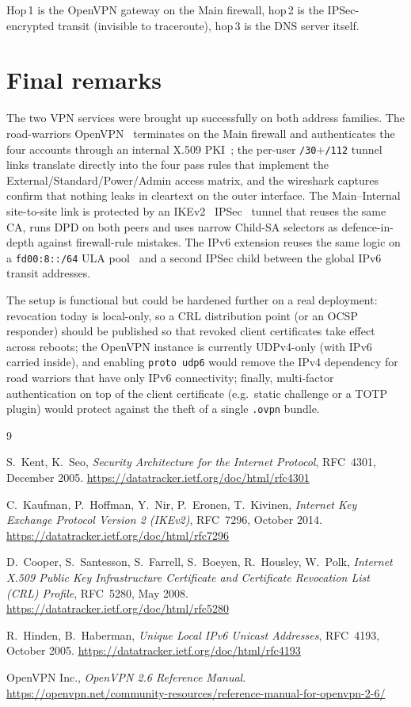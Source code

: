 \documentclass[twocolumn]{NobArticle}
\begin{document}
Hop\,1 is the OpenVPN gateway on the Main firewall, hop\,2 is the
IPSec-encrypted transit (invisible to traceroute), hop\,3 is the DNS
server itself.

\section{Final remarks}

The two VPN services were brought up successfully on both address
families. The road-warriors OpenVPN~\cite{openvpn} terminates on the
Main firewall and authenticates the four accounts through an internal
X.509 PKI~\cite{rfc5280}; the per-user \texttt{/30}+\texttt{/112} tunnel
links translate directly into the four pass rules that implement the
External/Standard/Power/Admin access matrix, and the wireshark captures
confirm that nothing leaks in cleartext on the outer interface. The
Main--Internal site-to-site link is protected by an IKEv2~\cite{rfc7296}
IPSec~\cite{rfc4301} tunnel that reuses the same CA, runs DPD on both
peers and uses narrow Child-SA selectors as defence-in-depth against
firewall-rule mistakes. The IPv6 extension reuses the same logic on a
\texttt{fd00:8::/64} ULA pool~\cite{rfc4193} and a second IPSec child
between the global IPv6 transit addresses.

The setup is functional but could be hardened further on a real
deployment: revocation today is local-only, so a CRL distribution point
(or an OCSP responder) should be published so that revoked client
certificates take effect across reboots; the OpenVPN instance is
currently UDPv4-only (with IPv6 carried inside), and enabling
\texttt{proto udp6} would remove the IPv4 dependency for road warriors
that have only IPv6 connectivity; finally, multi-factor authentication
on top of the client certificate (e.g.\ static challenge or a TOTP
plugin) would protect against the theft of a single \texttt{.ovpn}
bundle.

\begin{thebibliography}{9}

S.~Kent, K.~Seo,
\textit{Security Architecture for the Internet Protocol},
RFC~4301, December 2005.
\url{https://datatracker.ietf.org/doc/html/rfc4301}

C.~Kaufman, P.~Hoffman, Y.~Nir, P.~Eronen, T.~Kivinen,
\textit{Internet Key Exchange Protocol Version 2 (IKEv2)},
RFC~7296, October 2014.
\url{https://datatracker.ietf.org/doc/html/rfc7296}

D.~Cooper, S.~Santesson, S.~Farrell, S.~Boeyen, R.~Housley, W.~Polk,
\textit{Internet X.509 Public Key Infrastructure Certificate and
Certificate Revocation List (CRL) Profile},
RFC~5280, May 2008.
\url{https://datatracker.ietf.org/doc/html/rfc5280}

R.~Hinden, B.~Haberman,
\textit{Unique Local IPv6 Unicast Addresses},
RFC~4193, October 2005.
\url{https://datatracker.ietf.org/doc/html/rfc4193}

OpenVPN Inc.,
\textit{OpenVPN 2.6 Reference Manual}.
\url{https://openvpn.net/community-resources/reference-manual-for-openvpn-2-6/}

\end{thebibliography}
\end{document}
